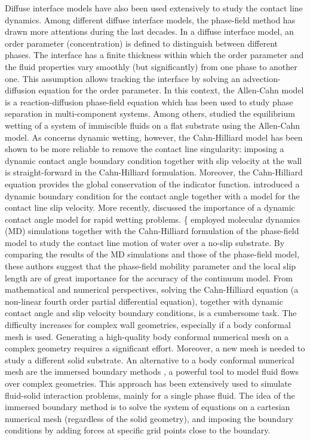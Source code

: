 \documentclass[review]{elsarticle}
\begin{document}
 Diffuse interface models have also been used extensively to study the contact line dynamics.  Among different diffuse interface models, the phase-field method has drawn more attentions during the last decades. In a diffuse interface model, an order parameter (concentration) is defined to distinguish between different phases. The interface has a finite thickness within which the order parameter and the fluid properties vary smoothly (but significantly) from one phase to another one.  This assumption allows tracking the interface by solving an advection-diffusion equation for the order parameter. In this context, the Allen-Cahn model \citep{Allen1979}  is a reaction-diffusion phase-field equation which has been used to study phase separation in multi-component systems. Among others, \cite{Marouen2014} studied the equilibrium wetting  of a system of  immiscible fluids on a flat  substrate using the Allen-Cahn model.  As concerns dynamic wetting, however, the Cahn-Hilliard model \cite[see][]{Cahn1961} has been shown to be more reliable to remove the contact line singularity: imposing a dynamic contact angle boundary condition together with slip velocity at the wall is straight-forward in the Cahn-Hilliard formulation. Moreover, the Cahn-Hilliard equation
 provides the global conservation of the indicator function.  \cite{Jacqmin1999} introduced a dynamic boundary condition for the contact angle together with a model for the contact line slip velocity.  More recently, \cite{Carlson2011} discussed the importance of  a dynamic contact angle model for rapid wetting problems.  \{\cite{Ugis} employed molecular dynamics (MD) simulations together with the Cahn-Hilliard formulation of the phase-field model to study the contact line motion of water over a no-slip substrate. By comparing the results of the MD simulations and those of the phase-field model, these authors suggest that the phase-field mobility parameter and the local slip length are of great importance for the accuracy of the continuum model. 
From mathematical and numerical perspectives, solving  the Cahn-Hilliard equation (a non-linear fourth order partial differential equation), together with dynamic contact angle and slip velocity boundary conditions, is  a cumbersome task. The difficulty increases for complex wall geometries, especially if a body conformal mesh is used. Generating a high-quality body conformal numerical mesh on a complex geometry requires a significant effort. Moreover, a new mesh is needed to study a different solid substrate. An alternative to a body conformal numerical mesh are the immersed boundary methods \citep{Peskin2002}, a powerful tool to model fluid flows over complex geometries. This approach has been extensively  used to simulate fluid-solid interaction problems, mainly for a single  phase fluid. The idea of the immersed boundary method is to solve the system of equations on a cartesian numerical mesh (regardless of the solid geometry), and imposing the boundary conditions by adding  forces at specific grid points close to the boundary.
\end{document}
